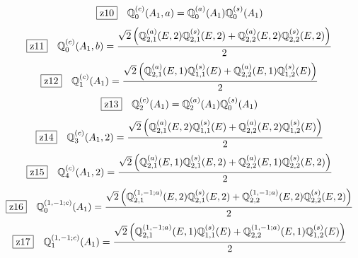 \documentclass[fleqn,10pt,landscape]{jsarticle}
\begin{document}
\begin{dmath*}
\hspace*{3mm}\fbox{z10}\quad \mathbb{Q}_{0}^{(c)}(A_{1},a)=\mathbb{Q}_{0}^{(a)}(A_{1}) \mathbb{Q}_{0}^{(s)}(A_{1})
\end{dmath*}
\begin{dmath*}
\hspace*{3mm}\fbox{z11}\quad \mathbb{Q}_{0}^{(c)}(A_{1},b)=\frac{\sqrt{2} \left(\mathbb{Q}_{2,1}^{(a)}(E,2) \mathbb{Q}_{2,1}^{(s)}(E,2) + \mathbb{Q}_{2,2}^{(a)}(E,2) \mathbb{Q}_{2,2}^{(s)}(E,2)\right)}{2}
\end{dmath*}
\begin{dmath*}
\hspace*{3mm}\fbox{z12}\quad \mathbb{Q}_{1}^{(c)}(A_{1})=\frac{\sqrt{2} \left(\mathbb{Q}_{2,1}^{(a)}(E,1) \mathbb{Q}_{1,1}^{(s)}(E) + \mathbb{Q}_{2,2}^{(a)}(E,1) \mathbb{Q}_{1,2}^{(s)}(E)\right)}{2}
\end{dmath*}
\begin{dmath*}
\hspace*{3mm}\fbox{z13}\quad \mathbb{Q}_{2}^{(c)}(A_{1})=\mathbb{Q}_{2}^{(a)}(A_{1}) \mathbb{Q}_{0}^{(s)}(A_{1})
\end{dmath*}
\begin{dmath*}
\hspace*{3mm}\fbox{z14}\quad \mathbb{Q}_{3}^{(c)}(A_{1},2)=\frac{\sqrt{2} \left(\mathbb{Q}_{2,1}^{(a)}(E,2) \mathbb{Q}_{1,1}^{(s)}(E) + \mathbb{Q}_{2,2}^{(a)}(E,2) \mathbb{Q}_{1,2}^{(s)}(E)\right)}{2}
\end{dmath*}
\begin{dmath*}
\hspace*{3mm}\fbox{z15}\quad \mathbb{Q}_{4}^{(c)}(A_{1},2)=\frac{\sqrt{2} \left(\mathbb{Q}_{2,1}^{(a)}(E,1) \mathbb{Q}_{2,1}^{(s)}(E,2) + \mathbb{Q}_{2,2}^{(a)}(E,1) \mathbb{Q}_{2,2}^{(s)}(E,2)\right)}{2}
\end{dmath*}
\begin{dmath*}
\hspace*{3mm}\fbox{z16}\quad \mathbb{Q}_{0}^{(1,-1;c)}(A_{1})=\frac{\sqrt{2} \left(\mathbb{Q}_{2,1}^{(1,-1;a)}(E,2) \mathbb{Q}_{2,1}^{(s)}(E,2) + \mathbb{Q}_{2,2}^{(1,-1;a)}(E,2) \mathbb{Q}_{2,2}^{(s)}(E,2)\right)}{2}
\end{dmath*}
\begin{dmath*}
\hspace*{3mm}\fbox{z17}\quad \mathbb{Q}_{1}^{(1,-1;c)}(A_{1})=\frac{\sqrt{2} \left(\mathbb{Q}_{2,1}^{(1,-1;a)}(E,1) \mathbb{Q}_{1,1}^{(s)}(E) + \mathbb{Q}_{2,2}^{(1,-1;a)}(E,1) \mathbb{Q}_{1,2}^{(s)}(E)\right)}{2}
\end{dmath*}
\end{document}
